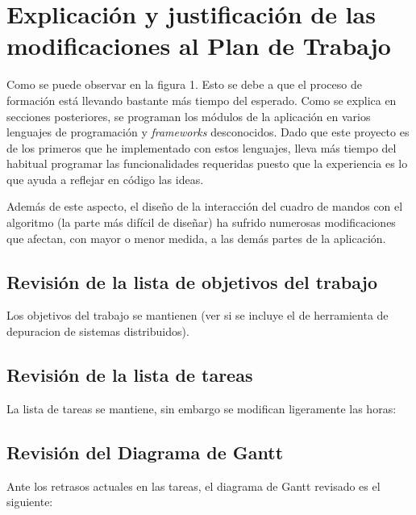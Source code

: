 \chapter*{Explicación y justificación de las modificaciones al Plan de Trabajo}

Como se puede observar en la figura 1. Esto se debe a que el proceso de formación está llevando bastante más tiempo del esperado. Como se explica en secciones posteriores, se programan los módulos de la aplicación en varios lenguajes de programación y \textit{frameworks} desconocidos. Dado que este proyecto es de los primeros que he implementado con estos lenguajes, lleva más tiempo del habitual programar las funcionalidades requeridas puesto que la experiencia es lo que ayuda a reflejar en código las ideas.

Además de este aspecto, el diseño de la interacción del cuadro de mandos con el algoritmo (la parte más difícil de diseñar) ha sufrido numerosas modificaciones que afectan, con mayor o menor medida, a las demás partes de la aplicación.

\section{Revisión de la lista de objetivos del trabajo}

Los objetivos del trabajo se mantienen (ver si se incluye el de herramienta de depuracion de sistemas distribuidos).

\section{Revisión de la lista de tareas}

La lista de tareas se mantiene, sin embargo se modifican ligeramente las horas:

\section{Revisión del Diagrama de Gantt}

Ante los retrasos actuales en las tareas, el diagrama de Gantt revisado es el siguiente:
